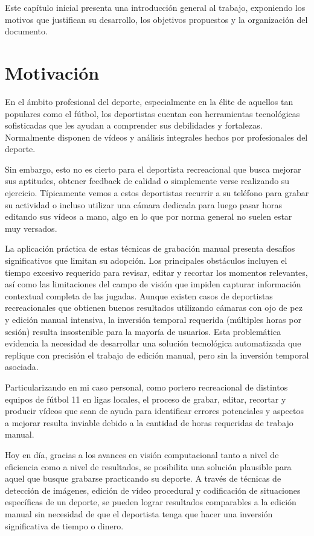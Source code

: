 Este capítulo inicial presenta una introducción general al trabajo, exponiendo los motivos que justifican su desarrollo, los objetivos propuestos y la organización del documento.

\section[Motivación]{Motivación}
En el ámbito profesional del deporte, especialmente en la élite de aquellos tan populares como el fútbol, los deportistas cuentan con herramientas tecnológicas sofisticadas que les ayudan a comprender sus debilidades y fortalezas. Normalmente disponen de vídeos y análisis integrales hechos por profesionales del deporte.

Sin embargo, esto no es cierto para el deportista recreacional que busca mejorar sus aptitudes, obtener feedback de calidad o simplemente verse realizando su ejercicio. Típicamente vemos a estos deportistas recurrir a su teléfono para grabar su actividad o incluso utilizar una cámara dedicada para luego pasar horas editando sus vídeos a mano, algo en lo que por norma general no suelen estar muy versados.

La aplicación práctica de estas técnicas de grabación manual presenta desafíos significativos que limitan su adopción. Los principales obstáculos incluyen el tiempo excesivo requerido para revisar, editar y recortar los momentos relevantes, así como las limitaciones del campo de visión que impiden capturar información contextual completa de las jugadas. Aunque existen casos de deportistas recreacionales que obtienen buenos resultados utilizando cámaras con ojo de pez y edición manual intensiva, la inversión temporal requerida (múltiples horas por sesión) resulta insostenible para la mayoría de usuarios. Esta problemática evidencia la necesidad de desarrollar una solución tecnológica automatizada que replique con precisión el trabajo de edición manual, pero sin la inversión temporal asociada.

Particularizando en mi caso personal, como portero recreacional de distintos equipos de fútbol 11 en ligas locales, el proceso de grabar, editar, recortar y producir vídeos que sean de ayuda para identificar errores potenciales y aspectos a mejorar resulta inviable debido a la cantidad de horas requeridas de trabajo manual.

Hoy en día, gracias a los avances en visión computacional tanto a nivel de eficiencia como a nivel de resultados, se posibilita una solución plausible para aquel que busque grabarse practicando su deporte. A través de técnicas de detección de imágenes, edición de vídeo procedural y codificación de situaciones específicas de un deporte, se pueden lograr resultados comparables a la edición manual sin necesidad de que el deportista tenga que hacer una inversión significativa de tiempo o dinero.

